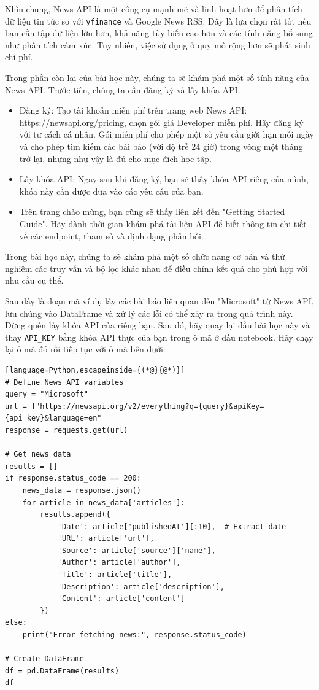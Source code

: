 Nhìn chung, News API là một công cụ mạnh mẽ và linh hoạt hơn để phân tích dữ liệu tin tức so với \texttt{yfinance} và Google News RSS. Đây là lựa chọn rất tốt nếu bạn cần tập dữ liệu lớn hơn, khả năng tùy biến cao hơn và các tính năng bổ sung như phân tích cảm xúc. Tuy nhiên, việc sử dụng ở quy mô rộng hơn sẽ phát sinh chi phí.

Trong phần còn lại của bài học này, chúng ta sẽ khám phá một số tính năng của News API. Trước tiên, chúng ta cần đăng ký và lấy khóa API.

\begin{itemize}
\item
  Đăng ký: Tạo tài khoản miễn phí trên trang web News API: https://newsapi.org/pricing, chọn gói giá Developer miễn phí. Hãy đăng ký với tư cách cá nhân. Gói miễn phí cho phép một số yêu cầu giới hạn mỗi ngày và cho phép tìm kiếm các bài báo (với độ trễ 24 giờ) trong vòng một tháng trở lại, nhưng như vậy là đủ cho mục đích học tập.
\item
  Lấy khóa API: Ngay sau khi đăng ký, bạn sẽ thấy khóa API riêng của mình, khóa này cần được đưa vào các yêu cầu của bạn.
\item
  Trên trang chào mừng, bạn cũng sẽ thấy liên kết đến "Getting Started Guide". Hãy dành thời gian khám phá tài liệu API để biết thông tin chi tiết về các endpoint, tham số và định dạng phản hồi.
\end{itemize}

Trong bài học này, chúng ta sẽ khám phá một số chức năng cơ bản và thử nghiệm các truy vấn và bộ lọc khác nhau để điều chỉnh kết quả cho phù hợp với nhu cầu cụ thể.

Sau đây là đoạn mã ví dụ lấy các bài báo liên quan đến "Microsoft" từ News API, lưu chúng vào DataFrame và xử lý các lỗi có thể xảy ra trong quá trình này. Đừng quên lấy khóa API của riêng bạn. Sau đó, hãy quay lại đầu bài học này và thay \texttt{API\_KEY} bằng khóa API thực của bạn trong ô mã ở đầu notebook. Hãy chạy lại ô mã đó rồi tiếp tục với ô mã bên dưới:

\begin{lstlisting}[language=Python,escapeinside={(*@}{@*)}]
# Define News API variables
query = "Microsoft"
url = f"https://newsapi.org/v2/everything?q={query}&apiKey={api_key}&language=en"
response = requests.get(url)

# Get news data
results = []
if response.status_code == 200:
    news_data = response.json()
    for article in news_data['articles']:
        results.append({
            'Date': article['publishedAt'][:10],  # Extract date
            'URL': article['url'],
            'Source': article['source']['name'],
            'Author': article['author'],
            'Title': article['title'],
            'Description': article['description'],
            'Content': article['content']
        })
else:
    print("Error fetching news:", response.status_code)

# Create DataFrame
df = pd.DataFrame(results)
df
\end{lstlisting}

